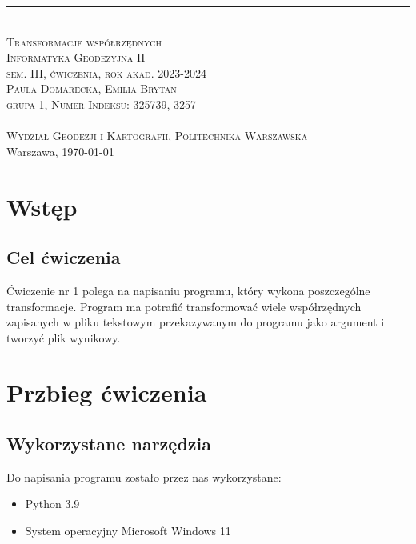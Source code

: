 \documentclass[10pt,a4paper]{article}
\newcommand{\authorName}{Paula Domarecka, Emilia Brytan \\ grupa 1, Numer Indeksu: 325739, 3257}
\newcommand{\titeReport}{Transformacje współrzędnych} %
\newcommand{\titleLecture}{Informatyka Geodezyjna II \\ sem. III, ćwiczenia, rok akad. 2023-2024} %
\newcommand{\faculty}{Wydział Geodezji i Kartografii}
\newcommand{\university}{Politechnika Warszawska}
\newcommand{\city}{Warszawa}
\begin{document}
		\rule{\textwidth}{.5pt} \\
		\vspace{1.0cm}
		\Large \textsc{\titeReport}
		\vspace{0.5cm} \\  
		\large \textsc{\titleLecture}
		\vspace{0.5cm}\\
		\textsc{\authorName}  \\
		\mymail \\
		\textsc{\faculty}, \textsc{\university}  \\ 
		\city, \today
	
	\tableofcontents
	\newpage
\section{Wstęp}
\subsection{Cel ćwiczenia}
Ćwiczenie nr 1 polega na napisaniu programu, który wykona poszczególne transformacje. Program ma potrafić transformować wiele współrzędnych zapisanych w pliku tekstowym przekazywanym do programu jako argument i tworzyć plik wynikowy. 
\section{Przbieg ćwiczenia}
\subsection{Wykorzystane narzędzia}
Do napisania programu zostało przez nas wykorzystane:
\begin{itemize}
	\item Python 3.9
	\item System operacyjny Microsoft Windows 11
\end{itemize}
\end{document}
